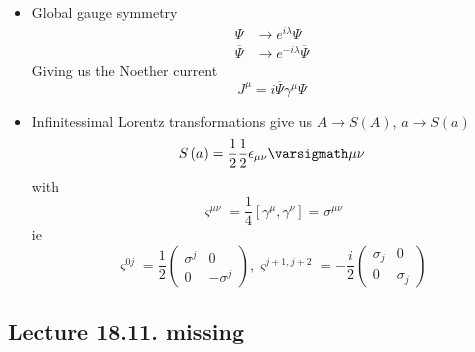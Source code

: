\documentclass{report}
\begin{document}
\begin{itemize}
  \item Global gauge symmetry 
    \begin{align*}
      \Psi &\to e^{i\lambda} \Psi \\
      \overline{\Psi} &\to e^{-i\lambda} \overline{\Psi} 
    \end{align*}
    Giving us the Noether current \[
    J^{\mu} = i \overline{\Psi} \gamma^{\mu} \Psi
    \] 
  \item Infinitessimal Lorentz transformations give us $A \to S\left( A \right) $, $a \to  S\left( a \right) $ \[
  S\left( a \right) = \frac{1}{2} \frac{1}{2} \epsilon_{\mu\nu} \varsigmath\mu \nu
  \] with \[
  \varsigma^{\mu\nu} = \frac{1}{4} \left[ \gamma^{\mu} , \gamma^{\nu} \right] = \sigma^{\mu\nu} 
  \] ie \[
  \varsigma^{0 j} = \frac{1}{2}  \begin{pmatrix} \sigma^{j} & 0 \\ 0 & -\sigma^{j}  \end{pmatrix} , \varsigma^{j+1, j+2}  = - \frac{i}{2}  \begin{pmatrix} \sigma_j & 0 \\ 0 & \sigma_j \end{pmatrix} 
  \] 
\end{itemize}
\subsection*{Lecture 18.11. missing}
\end{document}
